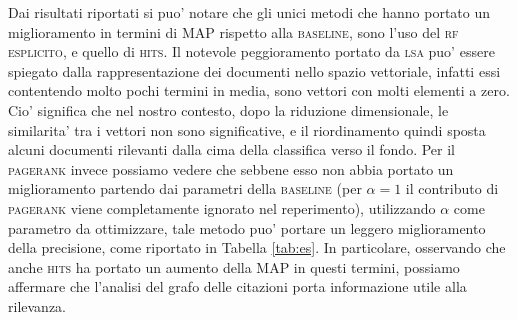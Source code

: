 Dai risultati riportati si puo' notare che gli unici metodi che hanno portato un miglioramento in termini di MAP rispetto alla \textsc{baseline}, sono l'uso del \textsc{rf esplicito}, e quello di \textsc{hits}. Il notevole peggioramento portato da \textsc{lsa} puo' essere spiegato dalla rappresentazione dei documenti nello spazio vettoriale, infatti essi contentendo molto pochi termini in media, sono vettori con molti elementi a zero. Cio' significa che nel nostro contesto, dopo la riduzione dimensionale, le similarita' tra i vettori non sono significative, e il riordinamento quindi sposta alcuni documenti rilevanti dalla cima della classifica verso il fondo. Per il \textsc{pagerank} invece possiamo vedere che sebbene esso non abbia portato un miglioramento partendo dai parametri della \textsc{baseline} (per $\alpha = 1$ il contributo di \textsc{pagerank} viene completamente ignorato nel reperimento), utilizzando $\alpha$ come parametro da ottimizzare, tale metodo puo' portare un leggero miglioramento della precisione, come riportato in Tabella \ref{tab:es}. In particolare, osservando che anche \textsc{hits} ha portato un aumento della MAP in questi termini, possiamo affermare che l'analisi del grafo delle citazioni porta informazione utile alla rilevanza.

